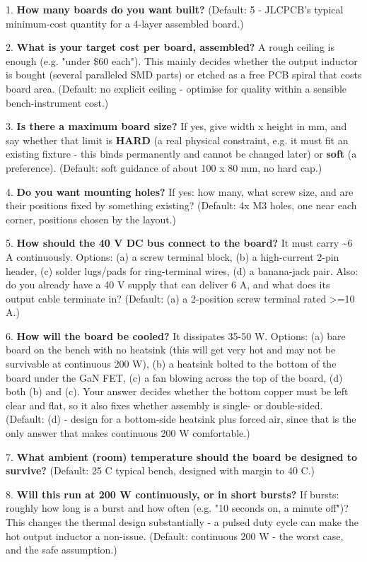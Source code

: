 \documentclass[11pt,a4paper]{article}
\begin{document}
1. \textbf{How many boards do you want built?} (Default: 5 - JLCPCB's typical minimum-cost quantity for a 4-layer assembled board.)

2. \textbf{What is your target cost per board, assembled?} A rough ceiling is enough (e.g. "under \$60 each"). This mainly decides whether the output inductor is bought (several paralleled SMD parts) or etched as a free PCB spiral that costs board area. (Default: no explicit ceiling - optimise for quality within a sensible bench-instrument cost.)

3. \textbf{Is there a maximum board size?} If yes, give width x height in mm, and say whether that limit is \textbf{HARD} (a real physical constraint, e.g. it must fit an existing fixture - this binds permanently and cannot be changed later) or \textbf{soft} (a preference). (Default: soft guidance of about 100 x 80 mm, no hard cap.)

4. \textbf{Do you want mounting holes?} If yes: how many, what screw size, and are their positions fixed by something existing? (Default: 4x M3 holes, one near each corner, positions chosen by the layout.)

5. \textbf{How should the 40 V DC bus connect to the board?} It must carry \textasciitilde{}6 A continuously. Options: (a) a screw terminal block, (b) a high-current 2-pin header, (c) solder lugs/pads for ring-terminal wires, (d) a banana-jack pair. Also: do you already have a 40 V supply that can deliver 6 A, and what does its output cable terminate in? (Default: (a) a 2-position screw terminal rated \textgreater{}=10 A.)

6. \textbf{How will the board be cooled?} It dissipates 35-50 W. Options: (a) bare board on the bench with no heatsink (this will get very hot and may not be survivable at continuous 200 W), (b) a heatsink bolted to the bottom of the board under the GaN FET, (c) a fan blowing across the top of the board, (d) both (b) and (c). Your answer decides whether the bottom copper must be left clear and flat, so it also fixes whether assembly is single- or double-sided. (Default: (d) - design for a bottom-side heatsink plus forced air, since that is the only answer that makes continuous 200 W comfortable.)

7. \textbf{What ambient (room) temperature should the board be designed to survive?} (Default: 25 C typical bench, designed with margin to 40 C.)

8. \textbf{Will this run at 200 W continuously, or in short bursts?} If bursts: roughly how long is a burst and how often (e.g. "10 seconds on, a minute off")? This changes the thermal design substantially - a pulsed duty cycle can make the hot output inductor a non-issue. (Default: continuous 200 W - the worst case, and the safe assumption.)
\end{document}
